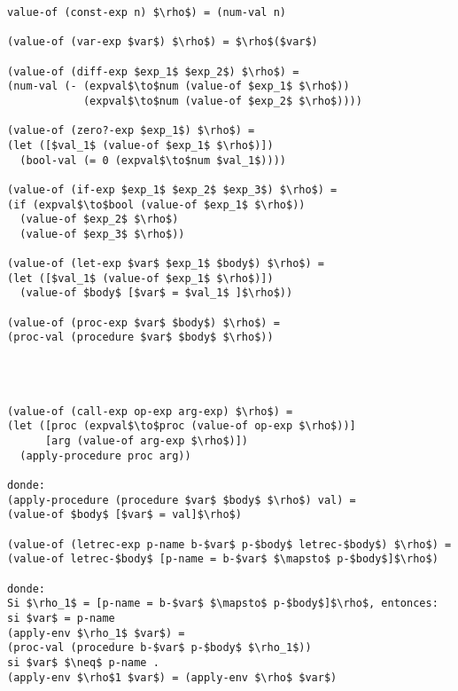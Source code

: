 \documentclass[11pt]{article}
\begin{document}
\begin{lstlisting}[mathescape]
value-of (const-exp n) $\rho$) = (num-val n) 

(value-of (var-exp $var$) $\rho$) = $\rho$($var$)

(value-of (diff-exp $exp_1$ $exp_2$) $\rho$) =
(num-val (- (expval$\to$num (value-of $exp_1$ $\rho$))
            (expval$\to$num (value-of $exp_2$ $\rho$))))

(value-of (zero?-exp $exp_1$) $\rho$) = 
(let ([$val_1$ (value-of $exp_1$ $\rho$)])
  (bool-val (= 0 (expval$\to$num $val_1$))))

(value-of (if-exp $exp_1$ $exp_2$ $exp_3$) $\rho$) = 
(if (expval$\to$bool (value-of $exp_1$ $\rho$))
  (value-of $exp_2$ $\rho$)
  (value-of $exp_3$ $\rho$))

(value-of (let-exp $var$ $exp_1$ $body$) $\rho$) = 
(let ([$val_1$ (value-of $exp_1$ $\rho$)])
  (value-of $body$ [$var$ = $val_1$ ]$\rho$))
  
(value-of (proc-exp $var$ $body$) $\rho$) = 
(proc-val (procedure $var$ $body$ $\rho$))




(value-of (call-exp op-exp arg-exp) $\rho$) = 
(let ([proc (expval$\to$proc (value-of op-exp $\rho$))]
      [arg (value-of arg-exp $\rho$)])
  (apply-procedure proc arg))
  
donde:
(apply-procedure (procedure $var$ $body$ $\rho$) val) =
(value-of $body$ [$var$ = val]$\rho$)

(value-of (letrec-exp p-name b-$var$ p-$body$ letrec-$body$) $\rho$) = 
(value-of letrec-$body$ [p-name = b-$var$ $\mapsto$ p-$body$]$\rho$)

donde:
Si $\rho_1$ = [p-name = b-$var$ $\mapsto$ p-$body$]$\rho$, entonces:
si $var$ = p-name
(apply-env $\rho_1$ $var$) =
(proc-val (procedure b-$var$ p-$body$ $\rho_1$))
si $var$ $\neq$ p-name .
(apply-env $\rho$1 $var$) = (apply-env $\rho$ $var$)



\end{lstlisting}
\end{document}
